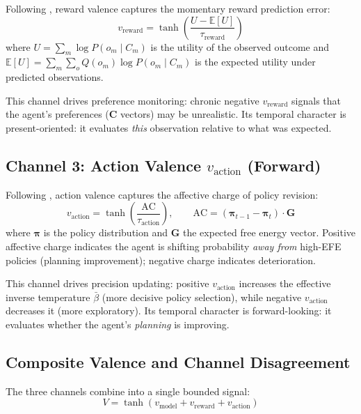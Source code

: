 \documentclass[11pt,a4paper]{article}
\begin{document}
Following \citet{pattisapu2024free}, reward valence captures the momentary reward prediction error:
\begin{equation}
    v_{\text{reward}} = \tanh\!\left(\frac{U - \mathbb{E}[U]}{\tau_{\text{reward}}}\right)
\end{equation}
where $U = \sum_m \log P(o_m \mid C_m)$ is the utility of the observed outcome and $\mathbb{E}[U] = \sum_m \sum_o Q(o_m) \log P(o_m \mid C_m)$ is the expected utility under predicted observations.

This channel drives preference monitoring: chronic negative $v_{\text{reward}}$ signals that the agent's preferences ($\mathbf{C}$ vectors) may be unrealistic. Its temporal character is present-oriented: it evaluates \emph{this} observation relative to what was expected.

\subsection{Channel 3: Action Valence $v_{\text{action}}$ (Forward)}\label{sec:v_action}

Following \citet{hesp2021deeply}, action valence captures the affective charge of policy revision:
\begin{equation}
    v_{\text{action}} = \tanh\!\left(\frac{\text{AC}}{\tau_{\text{action}}}\right), \qquad \text{AC} = (\boldsymbol{\pi}_{t-1} - \boldsymbol{\pi}_t) \cdot \mathbf{G}
\end{equation}
where $\boldsymbol{\pi}$ is the policy distribution and $\mathbf{G}$ the expected free energy vector. Positive affective charge indicates the agent is shifting probability \emph{away from} high-EFE policies (planning improvement); negative charge indicates deterioration.

This channel drives precision updating: positive $v_{\text{action}}$ increases the effective inverse temperature $\bar{\beta}$ (more decisive policy selection), while negative $v_{\text{action}}$ decreases it (more exploratory). Its temporal character is forward-looking: it evaluates whether the agent's \emph{planning} is improving.

\subsection{Composite Valence and Channel Disagreement}\label{sec:composite}

The three channels combine into a single bounded signal:
\begin{equation}
    V = \tanh(v_{\text{model}} + v_{\text{reward}} + v_{\text{action}})
\end{equation}
\end{document}
